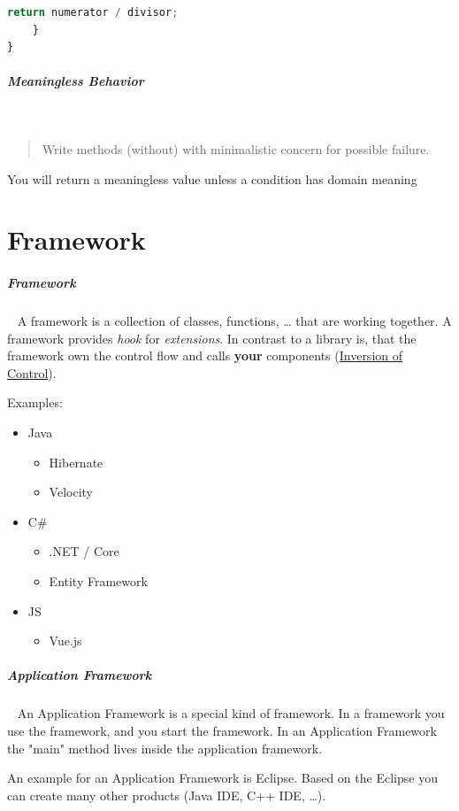 \documentclass[8pt,twoside,landscape]{extarticle}
\begin{document}
\begin{multicols}{4}
\begin{lstlisting}[language=js,label=lst:example-for-exceptional-behavior,caption={Example for Exceptional Behavior},captionpos=b,numbers=none]
	return numerator / divisor;
    }
}
\end{lstlisting}
\subparagraph{Meaningless Behavior} \
\label{sec:org1168d12}
\begin{quote}
Write methods (without) with minimalistic concern for possible failure.
\end{quote}

You will return a meaningless value unless a condition has domain meaning
\section{Framework}
\label{sec:org3406aa7}
\subparagraph{Framework} \
\label{sec:org12ebe80}
A framework is a collection of classes, functions, \ldots{} that are working together.
A framework provides \emph{hook} for \emph{extensions}.
In contrast to a library is, that the framework own the control flow and calls \textbf{your} components (\href{../../../roam/20230102153338-what_is_inversion_of_control.org}{Inversion of Control}).


Examples:
\begin{itemize}
\item Java
\begin{itemize}
\item Hibernate
\item Velocity
\end{itemize}
\item C\#
\begin{itemize}
\item .NET / Core
\item Entity Framework
\end{itemize}
\item JS
\begin{itemize}
\item Vue.js
\end{itemize}
\end{itemize}
\subparagraph{Application Framework} \
\label{sec:orga8f49fd}
An Application Framework is a special kind of framework.
In a framework you use the framework, and you start the framework.
In an Application Framework the "main" method lives inside the application framework.

An example for an Application Framework is Eclipse.
Based on the Eclipse you can create many other products (Java IDE, C++ IDE, \ldots{}).


\end{multicols}
\end{document}
